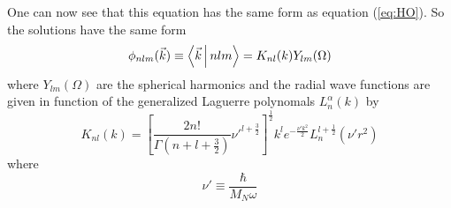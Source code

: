\documentclass[12pt]{article}
\begin{document}
One can now see that this equation has the same form as equation (\ref{eq:HO}). So the solutions have the same form
\begin{equation}
\phi_{nlm}(\vec{k}) \equiv \Braket{\vec{k}|nlm} = K_{nl}(k)Y_{lm}(\Omega)	
\end{equation}
where $Y_{lm}(\Omega)$ are the spherical harmonics and the radial wave functions are given in function of the generalized Laguerre polynomals $L^\alpha_n(k)$ by
\begin{equation}
 K_{nl}(k) = \left[ \frac{2n!}{\Gamma(n+l+\frac{3}{2})}\nu'^{l+\frac{3}{2}} \right]^{\frac{1}{2}} k^l e^{-\frac{\nu' k^2}{2}} L^{l+\frac{1}{2}}_n(\nu' r^2)
\end{equation}
where 
\begin{equation}
\nu' \equiv \frac{\hbar}{M_N \omega}
\end{equation}
\end{document}
